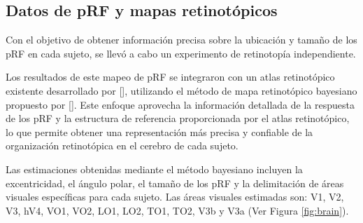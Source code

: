 \subsection{Datos de pRF y mapas retinot\'opicos}

Con el objetivo de obtener información precisa sobre la ubicación y tamaño de los pRF en cada sujeto, se llevó a cabo un experimento de retinotopía independiente. 

Los resultados de este mapeo de pRF se integraron con un atlas retinotópico existente desarrollado por [\cite{benson_retinotopic_2012}], utilizando el método de mapa retinotópico bayesiano propuesto por [\cite{benson_human_2018}]. Este enfoque aprovecha la información detallada de la respuesta de los pRF y la estructura de referencia proporcionada por el atlas retinotópico, lo que permite obtener una representación más precisa y confiable de la organización retinotópica en el cerebro de cada sujeto.

Las estimaciones obtenidas mediante el método bayesiano incluyen la excentricidad, el ángulo polar, el tamaño de los pRF y la delimitación de áreas visuales específicas para cada sujeto. Las áreas visuales estimadas son: V1, V2, V3, hV4, VO1, VO2, LO1, LO2, TO1, TO2, V3b y V3a (Ver Figura \ref{fig:brain}).

